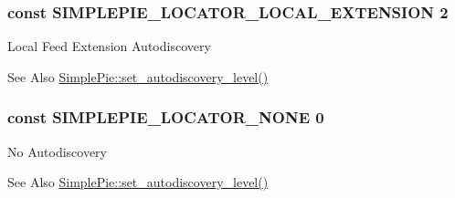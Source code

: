 \hypertarget{simplepie_8inc_a2096bb81875b5132817c0012d281de67}{
\subsubsection[{S\-I\-M\-P\-L\-E\-P\-I\-E\-\_\-\-L\-O\-C\-A\-T\-O\-R\-\_\-\-L\-O\-C\-A\-L\-\_\-\-E\-X\-T\-E\-N\-S\-I\-O\-N}]{\setlength{\rightskip}{0pt plus 5cm}const S\-I\-M\-P\-L\-E\-P\-I\-E\-\_\-\-L\-O\-C\-A\-T\-O\-R\-\_\-\-L\-O\-C\-A\-L\-\_\-\-E\-X\-T\-E\-N\-S\-I\-O\-N 2}}\label{simplepie_8inc_a2096bb81875b5132817c0012d281de67}
Local Feed Extension Autodiscovery \begin{DoxySeeAlso}{See Also}
\hyperlink{class_simple_pie_a4143ba9d144fe53d73c2f2a4f4136371}{Simple\-Pie\-::set\-\_\-autodiscovery\-\_\-level()} 
\end{DoxySeeAlso}
\hypertarget{simplepie_8inc_a09a383bfb38f1dda61a043e47dfb92a5}{
\subsubsection[{S\-I\-M\-P\-L\-E\-P\-I\-E\-\_\-\-L\-O\-C\-A\-T\-O\-R\-\_\-\-N\-O\-N\-E}]{\setlength{\rightskip}{0pt plus 5cm}const S\-I\-M\-P\-L\-E\-P\-I\-E\-\_\-\-L\-O\-C\-A\-T\-O\-R\-\_\-\-N\-O\-N\-E 0}}\label{simplepie_8inc_a09a383bfb38f1dda61a043e47dfb92a5}
No Autodiscovery \begin{DoxySeeAlso}{See Also}
\hyperlink{class_simple_pie_a4143ba9d144fe53d73c2f2a4f4136371}{Simple\-Pie\-::set\-\_\-autodiscovery\-\_\-level()} 
\end{DoxySeeAlso}
